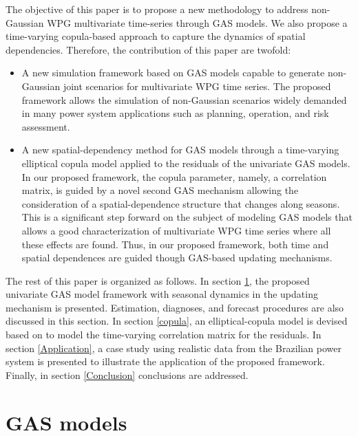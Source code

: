 \documentclass[a4paper]{IEEEtran}
\begin{document}
The objective of this paper is to propose a new methodology to address non-Gaussian WPG multivariate time-series through GAS models. We also propose a time-varying copula-based approach to capture the dynamics of spatial dependencies. Therefore, the contribution of this paper are twofold:

\begin{itemize}
	\item A new simulation framework based on GAS models capable to generate non-Gaussian joint scenarios for multivariate WPG time series. The proposed framework allows the simulation of non-Gaussian scenarios widely demanded in many power system applications such as planning, operation, and risk assessment.
	
	\item A new spatial-dependency method for GAS models through a time-varying elliptical copula model applied to the residuals of the univariate GAS models. In our proposed framework, the copula parameter, namely, a correlation matrix, is guided by a novel second GAS mechanism allowing the consideration of a spatial-dependence structure that changes along seasons. This is a significant step forward on the subject of modeling GAS models that allows a good characterization of multivariate WPG time series where all these effects are found. Thus, in our proposed framework, both time and spatial dependences are guided though GAS-based updating mechanisms.
\end{itemize}

The rest of this paper is organized as follows. In section \ref{marginals}, the proposed univariate GAS model framework with seasonal dynamics in the updating mechanism is presented. Estimation, diagnoses, and forecast procedures are also discussed in this section. In section \ref{copula}, an elliptical-copula model is devised based on \cite{creal2011dynamic} to model the time-varying correlation matrix for the residuals. In section \ref{Application}, a case study using realistic data from the Brazilian power system is presented to illustrate the application of the proposed framework. Finally, in section \ref{Conclusion} conclusions are addressed.


\section{GAS models} \label{marginals}
\end{document}
